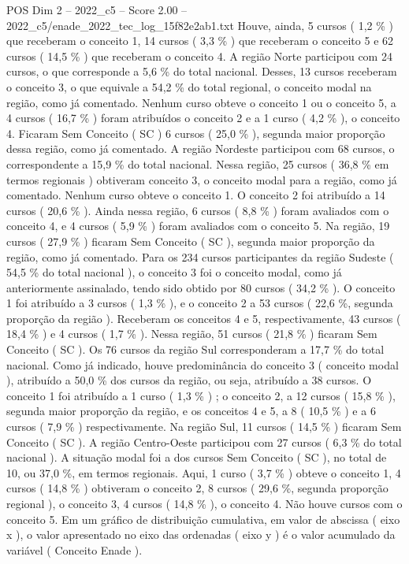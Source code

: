 \begin{textsample}{POS Dim 2 – 2022\_c5 – Score 2.00 – 2022\_c5/enade\_2022\_tec\_log\_15f82e2ab1.txt}
Houve, ainda, 5 cursos ( 1,2 \% ) que receberam o conceito 1, 14 cursos ( 3,3 \% ) que receberam o conceito 5 e 62 cursos ( 14,5 \% ) que receberam o conceito 4.
A região Norte participou com 24 cursos, o que corresponde a 5,6 \% do total nacional.
Desses, 13 cursos receberam o conceito 3, o que equivale a 54,2 \% do total regional, o conceito modal na região, como já comentado.
Nenhum curso obteve o conceito 1 ou o conceito 5, a 4 cursos ( 16,7 \% ) foram atribuídos o conceito 2 e a 1 curso ( 4,2 \% ), o conceito 4.
Ficaram Sem Conceito ( SC ) 6 cursos ( 25,0 \% ), segunda maior proporção dessa região, como já comentado.
A região Nordeste participou com 68 cursos, o correspondente a 15,9 \% do total nacional.
Nessa região, 25 cursos ( 36,8 \% em termos regionais ) obtiveram conceito 3, o conceito modal para a região, como já comentado.
Nenhum curso obteve o conceito 1.
O conceito 2 foi atribuído a 14 cursos ( 20,6 \% ).
Ainda nessa região, 6 cursos ( 8,8 \% ) foram avaliados com o conceito 4, e 4 cursos ( 5,9 \% ) foram avaliados com o conceito 5.
Na região, 19 cursos ( 27,9 \% ) ficaram Sem Conceito ( SC ), segunda maior proporção da região, como já comentado.
Para os 234 cursos participantes da região Sudeste ( 54,5 \% do total nacional ), o conceito 3 foi o conceito modal, como já anteriormente assinalado, tendo sido obtido por 80 cursos ( 34,2 \% ).
O conceito 1 foi atribuído a 3 cursos ( 1,3 \% ), e o conceito 2 a 53 cursos ( 22,6 \%, segunda proporção da região ).
Receberam os conceitos 4 e 5, respectivamente, 43 cursos ( 18,4 \% ) e 4 cursos ( 1,7 \% ).
Nessa região, 51 cursos ( 21,8 \% ) ficaram Sem Conceito ( SC ).
Os 76 cursos da região Sul corresponderam a 17,7 \% do total nacional.
Como já indicado, houve predominância do conceito 3 ( conceito modal ), atribuído a 50,0 \% dos cursos da região, ou seja, atribuído a 38 cursos.
O conceito 1 foi atribuído a 1 curso ( 1,3 \% ) ; o conceito 2, a 12 cursos ( 15,8 \% ), segunda maior proporção da região, e os conceitos 4 e 5, a 8 ( 10,5 \% ) e a 6 cursos ( 7,9 \% ) respectivamente.
Na região Sul, 11 cursos ( 14,5 \% ) ficaram Sem Conceito ( SC ).
A região Centro-Oeste participou com 27 cursos ( 6,3 \% do total nacional ).
A situação modal foi a dos cursos Sem Conceito ( SC ), no total de 10, ou 37,0 \%, em termos regionais.
Aqui, 1 curso ( 3,7 \% ) obteve o conceito 1, 4 cursos ( 14,8 \% ) obtiveram o conceito 2, 8 cursos ( 29,6 \%, segunda proporção regional ), o conceito 3, 4 cursos ( 14,8 \% ), o conceito 4.
Não houve cursos com o conceito 5.
Em um gráfico de distribuição cumulativa, em valor de abscissa ( eixo x ), o valor apresentado no eixo das ordenadas ( eixo y ) é o valor acumulado da variável ( Conceito Enade ).

\end{textsample}
